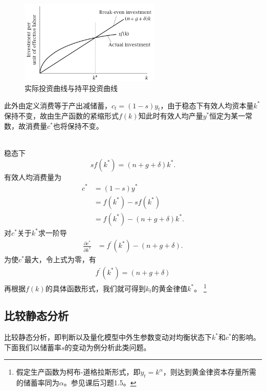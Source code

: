 \documentclass[cn,normal,11pt,black]{elegantnote}
\begin{document}
\begin{figure}[!htbp]
    \centering
    \includegraphics[width=0.6\textwidth]{image/s1.png}
    \caption{实际投资曲线与持平投资曲线}     \label{solows1}
\end{figure}

此外由定义消费等于产出减储蓄，$c_t = (1-s)y_t$，由于稳态下有效人均资本量$k^*$保持不变，故由生产函数的紧缩形式$f(k)$知此时有效人均产量$y^*$恒定为某一常数，故消费量$c^*$也将保持不变。

\begin{example}[$k^*$的黄金律值] \label{solowkgr}
    \mbox{} \\
    稳态下 
    \begin{equation*}
        sf(k^*) = (n+g+\delta)k^*.
    \end{equation*}
    有效人均消费量为
    \begin{align*}
        c^* & = (1-s)y^* \\
            & = f(k^*) - sf(k^*) \\
            & = f(k^*) - (n+g+\delta)k^*.
    \end{align*}
    对$c^*$关于$k^*$求一阶导
    \begin{align*}
        \frac{\partial c^*}{\partial k^*} & = f^\prime(k^*) - (n+g+\delta) .
    \end{align*}
    为使$c^*$最大，令上式为零，有
    \begin{align*}
        f^\prime(k^*) = (n+g+\delta)
    \end{align*}
    再根据$f(k)$的具体函数形式，我们就可得到$k_t$的黄金律值$k^*$。
    \footnote{假定生产函数为柯布-道格拉斯形式，即$y_t = k^\alpha$，则达到黄金律资本存量所需的储蓄率同为$\alpha$。参见课后习题1.5。}
\end{example}

\subsection{比较静态分析}

比较静态分析，即判断以及量化模型中外生参数变动对均衡状态下$k^*$和$c^*$的影响。
下面我们以储蓄率$s$的变动为例分析此类问题。
\end{document}
